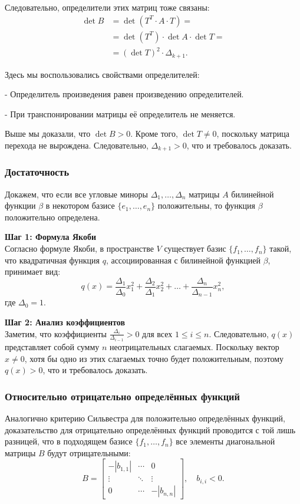 \documentclass[12pt]{article}
\begin{document}
Следовательно, определители этих матриц тоже связаны:
\begin{align*}
\det B &= \det(T^T \cdot A \cdot T) = \\
&= \det(T^T) \cdot \det A \cdot \det T = \\
&= (\det T)^2 \cdot \Delta_{k+1}.
\end{align*}

Здесь мы воспользовались свойствами определителей:

    
- Определитель произведения равен произведению определителей.
    
- При транспонировании матрицы её определитель не меняется.


Выше мы доказали, что $\det B > 0$. Кроме того, $\det T \neq 0$, поскольку матрица перехода не вырождена. Следовательно, $\Delta_{k+1} > 0$, что и требовалось доказать.


\subsubsection*{Достаточность}
Докажем, что если все угловые миноры $\Delta_1, \dots, \Delta_n$ матрицы $A$ билинейной функции $\beta$ в некотором базисе $\{e_1, \dots, e_n\}$ положительны, то функция $\beta$ положительно определена.

\textbf{Шаг 1: Формула Якоби} \\
Согласно формуле Якоби, в пространстве $V$ существует базис $\{f_1, \dots, f_n\}$ такой, что квадратичная функция $q$, ассоциированная с билинейной функцией $\beta$, принимает вид:
\[
q(x) = \frac{\Delta_1}{\Delta_0} x_1^2 + \frac{\Delta_2}{\Delta_1} x_2^2 + \ldots + \frac{\Delta_n}{\Delta_{n-1}} x_n^2,
\]
где $\Delta_0 = 1$.

\textbf{Шаг 2: Анализ коэффициентов} \\
Заметим, что коэффициенты $\frac{\Delta_i}{\Delta_{i-1}} > 0$ для всех $1 \leq i \leq n$. Следовательно, $q(x)$ представляет собой сумму $n$ неотрицательных слагаемых. Поскольку вектор $x \neq 0$, хотя бы одно из этих слагаемых точно будет положительным, поэтому $q(x) > 0$, что и требовалось доказать.

\subsubsection*{Относительно отрицательно определённых функций}
Аналогично критерию Сильвестра для положительно определённых функций, доказательство для отрицательно определённых функций проводится с той лишь разницей, что в подходящем базисе $\{f_1, \dots, f_n\}$ все элементы диагональной матрицы $B$ будут отрицательными:
\[
B =
\begin{bmatrix}
-|b_{1,1}| & \cdots & 0 \\
\vdots & \ddots & \vdots \\
0 & \cdots & -|b_{n,n}|
\end{bmatrix}, \quad b_{i,i} < 0.
\]
\end{document}
